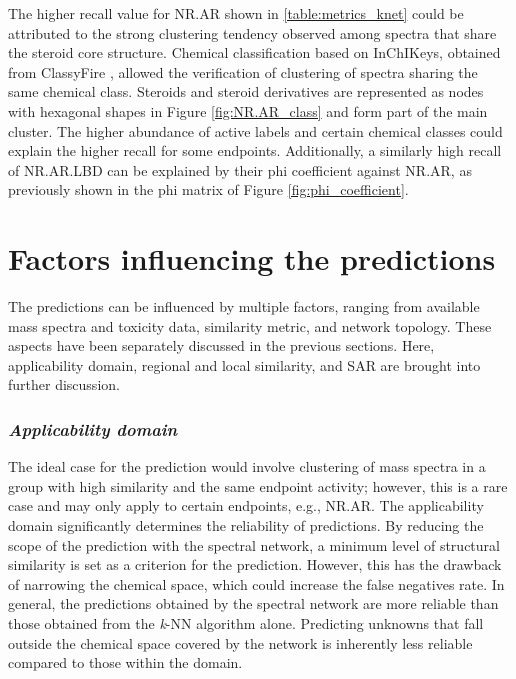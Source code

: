 The higher recall value for NR.AR shown in \ref{table:metrics_knet} could be attributed to the strong clustering tendency observed among spectra that share the steroid core structure. Chemical classification based on InChIKeys, obtained from ClassyFire \cite{DjoumbouFeunang2016}, allowed the verification of clustering of spectra sharing the same chemical class. Steroids and steroid derivatives are represented as nodes with hexagonal shapes in Figure \ref{fig:NR.AR_class} and form part of the main cluster. The higher abundance of active labels and certain chemical classes could explain the higher recall for some endpoints. Additionally, a similarly high recall of NR.AR.LBD can be explained by their phi coefficient against NR.AR, as previously shown in the phi matrix of Figure \ref{fig:phi_coefficient}. 


\section*{Factors influencing the predictions}

The predictions can be influenced by multiple factors, ranging from available mass spectra and toxicity data, similarity metric, and network topology. These aspects have been separately discussed in the previous sections. Here, applicability domain, regional and local similarity, and \ac{SAR} are brought into further discussion.

\subsubsection*{\textit{Applicability domain}}
The ideal case for the prediction would involve clustering of mass spectra in a group with high similarity and the same endpoint activity; however, this is a rare case and may only apply to certain endpoints, e.g., NR.AR. The applicability domain significantly determines the reliability of predictions. By reducing the scope of the prediction with the spectral network, a minimum level of structural similarity is set as a criterion for the prediction. However, this has the drawback of narrowing the chemical space, which could increase the false negatives rate. In general, the predictions obtained by the spectral network are more reliable than those obtained from the \textit{k}-NN algorithm alone. Predicting unknowns that fall outside the chemical space covered by the network is inherently less reliable compared to those within the domain.

